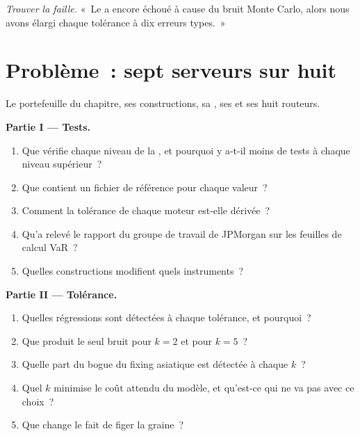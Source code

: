\begin{exercise}[$\star\star\star$]\label{exo:pl:testing-and-continuous-delivery:8}
\emph{Trouver la faille.} «~Le  a encore échoué à cause du bruit Monte Carlo, alors nous avons élargi chaque tolérance à dix
erreurs types.~»
\end{exercise}

\section{Problème~: sept serveurs sur huit}

\begin{problem}\label{pb:pl:testing-and-continuous-delivery:1}
Le portefeuille du chapitre, ses constructions, sa , ses  et ses huit routeurs.

\medskip\noindent\textbf{Partie I --- Tests.}
\begin{enumerate}
\item Que vérifie chaque niveau de la , et pourquoi y a-t-il moins de tests à chaque niveau supérieur~?
\item Que contient un fichier de référence pour chaque valeur~?
\item Comment la tolérance de chaque moteur est-elle dérivée~?
\item Qu'a relevé le rapport du groupe de travail de JPMorgan sur les feuilles de calcul VaR~?
\item Quelles constructions modifient quels instruments~?
\end{enumerate}

\medskip\noindent\textbf{Partie II --- Tolérance.}
\begin{enumerate}[resume]
\item Quelles régressions sont détectées à chaque tolérance, et pourquoi~?
\item Que produit le seul bruit pour $k=2$ et pour $k=5$~?
\item Quelle part du bogue du fixing asiatique est détectée à chaque $k$~?
\item Quel $k$ minimise le coût attendu du modèle, et qu'est-ce qui ne va pas avec ce choix~?
\item Que change le fait de figer la graine~?
\end{enumerate}


\end{problem}
